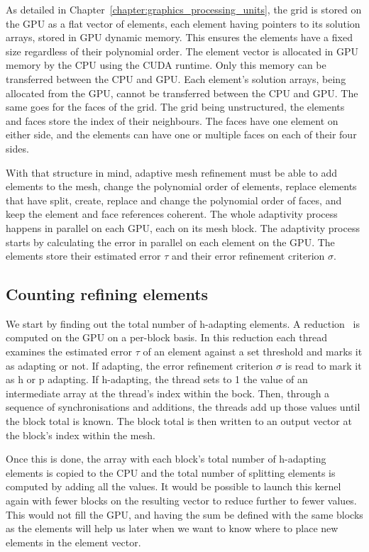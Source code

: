 As detailed in Chapter~\ref{chapter:graphics_processing_units}, the grid is stored on the GPU as a
flat vector of elements, each element having pointers to its solution arrays, stored in GPU dynamic
memory. This ensures the elements have a fixed size regardless of their polynomial order. The
element vector is allocated in GPU memory by the CPU using the CUDA runtime. Only this memory can be
transferred between the CPU and GPU. Each element's solution arrays, being allocated from the GPU,
cannot be transferred between the CPU and GPU. The same goes for the faces of the grid. The grid
being unstructured, the elements and faces store the index of their neighbours. The faces have one
element on either side, and the elements can have one or multiple faces on each of their four sides.

With that structure in mind, adaptive mesh refinement must be able to add elements to the mesh,
change the polynomial order of elements, replace elements that have split, create, replace and
change the polynomial order of faces, and keep the element and face references coherent. The whole
adaptivity process happens in parallel on each GPU, each on its mesh block. The adaptivity process
starts by calculating the error in parallel on each element on the GPU. The elements store their
estimated error $\tau$ and their error refinement criterion $\sigma$.

\subsection{Counting refining elements} \label{subsection:adaptive_mesh_refinement:implementation:counting_refining_elements}


We start by finding out the total number of h-adapting elements. A reduction~\cite{Harris2007} is
computed on the GPU on a per-block basis. In this reduction each thread examines the estimated error
$\tau$ of an element against a set threshold and marks it as adapting or not. If adapting, the error
refinement criterion $\sigma$ is read to mark it as h or p adapting. If h-adapting, the thread sets
to 1 the value of an intermediate array at the thread's index within the bock. Then, through a
sequence of synchronisations and additions, the threads add up those values until the block total is
known. The block total is then written to an output vector at the block's index within the mesh.

Once this is done, the array with each block's total number of h-adapting elements is copied to the
CPU and the total number of splitting elements is computed by adding all the values. It would be
possible to launch this kernel again with fewer blocks on the resulting vector to reduce further to
fewer values. This would not fill the GPU, and having the sum be defined with the same blocks as the
elements will help us later when we want to know where to place new elements in the element vector.

